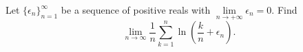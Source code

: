 Let \(\{\epsilon_n\}^\infty_{n=1}\) be a sequence of positive reals with \(\lim\limits_{n\rightarrow+\infty}\epsilon_n = 0\). Find \[ \lim\limits_{n\rightarrow\infty}\dfrac{1}{n}\sum\limits^{n}_{k=1}\ln\left(\dfrac{k}{n}+\epsilon_n\right).  \]
